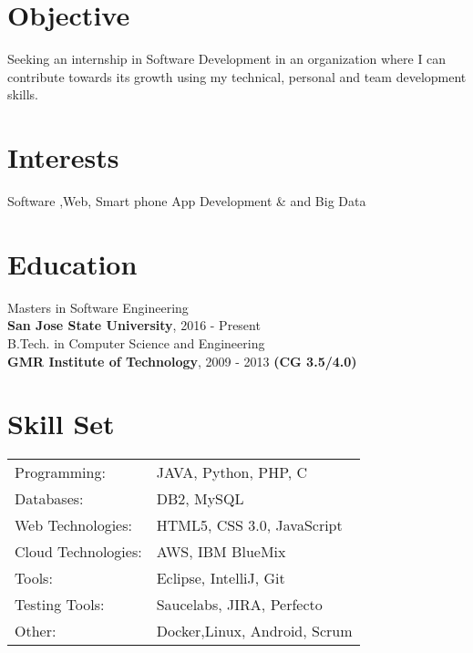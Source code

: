 \documentclass[margin]{res}
\begin{document}

\address{ \textbf{Phone}:\hspace{1mm}\href{+1-669-400-9729}{+1-669-400-9729}\hspace{5mm} \textbf{Github}:\hspace{1mm}\href{https://github.com/akshay-agarwal}{akshay-agarwal}\hspace{5mm}      \textbf{Email}:\hspace{1mm}\href{mailto:akshay.agwl@gmail.com}{akshay.agwl@gmail.comm} }

\begin{resume}

\section{Objective}

  Seeking an  internship in Software Development in an organization where I can contribute towards its growth using my technical, personal and team development skills.
  
\section{Interests}

  Software ,Web, Smart phone App Development & and Big Data

\section{Education}
  Masters in Software Engineering \\
  {\bf San Jose State University}, 2016 - Present \\  
  
  B.Tech. in Computer Science and Engineering \\
  {\bf GMR Institute of Technology}, 2009 - 2013 {\bf (CG 3.5/4.0) } \\
  
\section{Skill Set}
   \begin{tabular}{l p{3in}}
    {Programming:} & JAVA, Python, PHP, C \\
    {Databases:} &  DB2, MySQL \\
    {Web Technologies:} &  HTML5, CSS 3.0, JavaScript \\
    {Cloud Technologies:} &  AWS, IBM BlueMix \\
    {Tools:} & Eclipse, IntelliJ, Git \\
    {Testing Tools:} & Saucelabs, JIRA, Perfecto \\
    {Other:} & Docker,Linux, Android, Scrum \\
     \end{tabular}


\end{resume}
\end{document}

